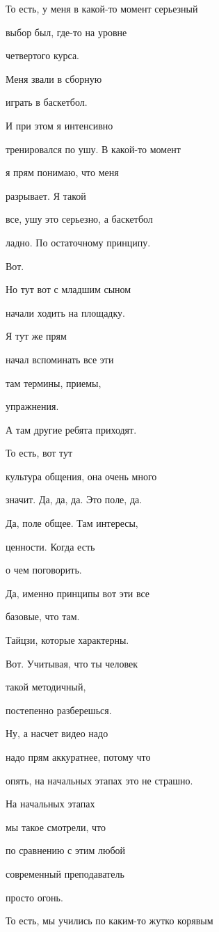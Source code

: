 То есть, у меня в какой-то момент серьезный

выбор был, где-то на уровне

четвертого курса.

Меня звали в сборную

играть в баскетбол.

И при этом я интенсивно

тренировался по ушу. В какой-то момент

я прям понимаю, что меня

разрывает. Я такой

все, ушу это серьезно, а баскетбол

ладно. По остаточному принципу.

Вот.

Но тут вот с младшим сыном

начали ходить на площадку.

Я тут же прям

начал вспоминать все эти

там термины, приемы,

упражнения.

А там другие ребята приходят.

То есть, вот тут

культура общения, она очень много

значит. Да, да, да. Это поле, да.

Да, поле общее. Там интересы,

ценности. Когда есть

о чем поговорить.

Да, именно принципы вот эти все

базовые, что там.

Тайцзи, которые характерны.

Вот. Учитывая, что ты человек

такой методичный,

постепенно разберешься.

Ну, а насчет видео надо

надо прям аккуратнее, потому что

опять, на начальных этапах это не страшно.

На начальных этапах

мы такое смотрели, что

по сравнению с этим любой

современный преподаватель

просто огонь.

То есть, мы учились по каким-то жутко корявым


